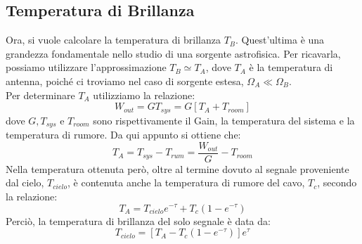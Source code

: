 \subsection{Temperatura di Brillanza}
Ora, si vuole calcolare la temperatura di brillanza $T_{B}$. Quest'ultima è una grandezza fondamentale nello studio di una sorgente astrofisica. Per ricavarla, possiamo utilizzare l'approssimazione $T_{B} \simeq T_{A}$, dove $T_{A}$ è la temperatura di antenna, poiché ci troviamo nel caso di sorgente estesa, $\Omega_{A} \ll \Omega_{B}$.\\
Per determinare $T_{A}$ utilizziamo la relazione:
\begin{equation}
    W_{out}=GT_{sys}=G[T_{A}+T_{room}]
\end{equation}
dove $G, T_{sys}$ e $T_{room}$ sono rispettivamente il Gain, la temperatura del sistema e la temperatura di rumore.
Da qui appunto si ottiene che:
\begin{equation}
    T_{A}=T_{sys}-T_{rum}=\frac{W_{out}}{G}-T_{room} 
\label{temp antenna}
\end{equation}
Nella temperatura ottenuta però, oltre al termine dovuto al segnale proveniente dal cielo, $T_{cielo}$, è contenuta anche la temperatura di rumore del cavo, $T_{c}$, secondo la relazione:
\begin{equation}
    T_{A}=T_{cielo}e^{-\tau}+T_{c}(1-e^{-\tau})
\end{equation}
Perciò, la temperatura di brillanza del solo segnale è data da:
\begin{equation}
    T_{cielo}=[T_{A}-T_{c}(1-e^{-\tau})]e^{\tau}
\label{temp cielo}
\end{equation}

